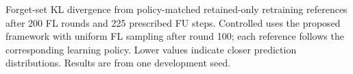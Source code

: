 \caption{Forget-set KL divergence from policy-matched retained-only retraining references after 200 FL rounds and 225 prescribed FU steps. Controlled uses the proposed framework with uniform FL sampling after round 100; each reference follows the corresponding learning policy. Lower values indicate closer prediction distributions. Results are from one development seed.}
